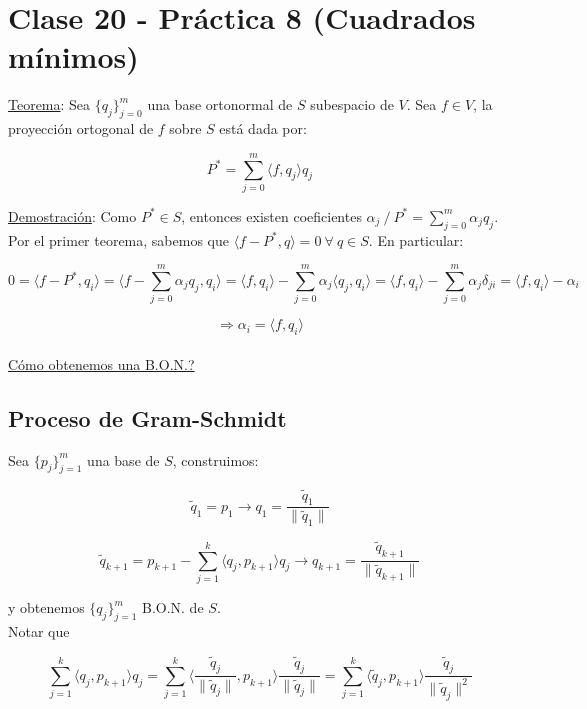 \section{Clase 20 - Pr\'actica 8 (Cuadrados m\'inimos)}

\underline{Teorema}: Sea $\{q_{j}\}_{j = 0}^{m}$ una base ortonormal de $S$ subespacio de $V$. Sea $f \in V$, la proyecci\'on ortogonal de $f$ sobre $S$ est\'a dada por:

$$P^{*} = \sum \limits_{j = 0}^{m} \langle f, q_{j} \rangle q_{j}$$

\underline{Demostraci\'on}: Como $P^{*} \in S$, entonces existen coeficientes $\alpha_{j}\ / \ P^{*} = \sum \limits_{j = 0}^{m} \alpha_{j}q_{j}$. Por el primer teorema, sabemos que $\langle f - P^{*}, q \rangle = 0\ \forall \ q \in S$. En particular:

$$0 = \langle f - P^{*}, q_{i} \rangle = \langle f - \sum \limits_{j = 0}^{m} \alpha_{j}q_{j}, q_{i} \rangle = \langle f, q_{i} \rangle - \sum \limits_{j = 0}^{m} \alpha_{j} \langle q_{j}, q_{i} \rangle = \langle f, q_{i} \rangle - \sum \limits_{j = 0}^{m} \alpha_{j} \delta_{ji} =\langle f, q_{i} \rangle - \alpha_{i}$$

$$\Rightarrow \alpha_{i} = \langle f, q_{i} \rangle$$\\

\underline{C\'omo obtenemos una B.O.N.?}

\subsection{Proceso de Gram-Schmidt}

Sea $\{p_{j}\}_{j = 1}^{m}$ una base de $S$, construimos:

$$\tilde{q}_{1} = p_{1} \rightarrow q_{1} = \frac{\tilde{q}_{1}}{\|\tilde{q}_{1}\|}$$

$$\tilde{q}_{k + 1} = p_{k + 1} - \sum \limits_{j = 1}^{k} \langle q_{j}, p_{k + 1} \rangle q_{j} \rightarrow q_{k + 1} = \frac{\tilde{q}_{k + 1}}{\|\tilde{q}_{k + 1}\|}$$

y obtenemos $\{q_{j}\}_{j = 1}^{m}$ B.O.N. de $S$.\\

Notar que

$$\sum \limits_{j = 1}^{k} \langle q_{j}, p_{k + 1} \rangle q_{j} = \sum \limits_{j = 1}^{k} \langle \frac{\tilde{q}_{j}}{\|\tilde{q}_{j}\|}, p_{k + 1} \rangle \frac{\tilde{q}_{j}}{\|\tilde{q}_{j}\|} = \sum \limits_{j = 1}^{k} \langle \tilde{q}_{j}, p_{k + 1} \rangle \frac{\tilde{q}_{j}}{\|\tilde{q}_{j}\|^{2}}$$\\

